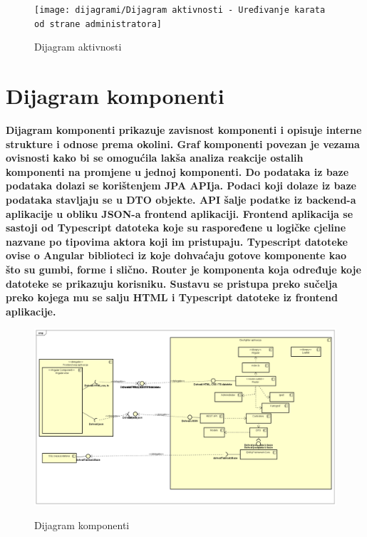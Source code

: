 			\begin{figure}[H]
				\centering
				\texttt{[image: dijagrami/Dijagram aktivnosti - Uređivanje karata od strane administratora]} \\
				\caption{Dijagram aktivnosti}
				\label{fig:UC8_sekvencijski}
			\end{figure}
			
			\eject
		\section{Dijagram komponenti}
		
			\textbf{\textnormal{Dijagram komponenti prikazuje zavisnost komponenti i opisuje interne strukture i odnose prema okolini. Graf komponenti povezan je vezama ovisnosti kako bi se omogućila lakša analiza reakcije ostalih komponenti na promjene u jednoj komponenti. Do podataka iz baze podataka dolazi se korištenjem JPA APIja. Podaci koji dolaze iz baze podataka stavljaju se u DTO objekte. API šalje podatke iz backend-a aplikacije u obliku JSON-a frontend aplikaciji. Frontend aplikacija se sastoji od Typescript datoteka koje su raspoređene u logičke cjeline nazvane po tipovima aktora koji im pristupaju. Typescript datoteke ovise o Angular biblioteci iz koje dohvaćaju gotove komponente kao što su gumbi, forme i slično. Router je komponenta koja određuje koje datoteke se prikazuju korisniku. Sustavu se pristupa preko sučelja preko kojega mu se salju HTML i Typescript datoteke iz frontend aplikacije.}}\\
			
			\begin{figure}[H]
				\centering
				\includegraphics[scale=0.32]{dijagrami/ComponentDiagramGeoF} \\
				\caption{Dijagram komponenti}
				\label{fig:UC8_sekvencijski}
			\end{figure}
			
		